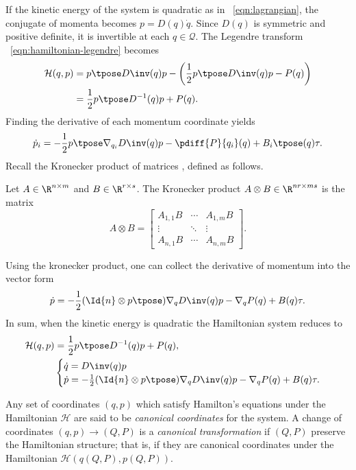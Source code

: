 If the kinetic energy of the system is quadratic as in ~\eqref{eqn:lagrangian}, 
the conjugate of momenta becomes \(p = D(q)\dot{q}\). Since \(D(q)\) is symmetric
and positive definite, it is invertible at each \(q \in \mathcal{Q}\).
The Legendre transform ~\eqref{eqn:hamiltonian-legendre} becomes
\begin{align*}
    \mathcal{H}(q,p) &= p\tpose D\inv(q)p - \left( \frac{1}{2}p\tpose D\inv(q) p -
    P(q) \right) \\
         &= \frac{1}{2} p\tpose D^{-1}(q) p + P(q)
    .
\end{align*}
Finding the derivative of each momentum coordinate yields
\[
    \dot{p}_i = -\frac{1}{2} p\tpose \nabla_{q_i}D\inv(q) p 
        - \pdiff{P}{q_i}(q) + B_i\tpose(q) \tau
    .
\]
Recall the Kronecker product of matrices \cite{kronprod}, defined as follows.
\begin{defn}
    Let \(A \in \R^{n \times m}\) and \(B \in \R^{r \times s}\).
    The Kronecker product \(A \otimes B \in \R^{nr \times ms}\) is the  matrix
    \[
        A \otimes B = \begin{bmatrix}
            A_{1,1}B & \cdots & A_{1,m} B \\
            \vdots & \ddots & \vdots \\
            A_{n,1} B & \cdots & A_{n,m} B
        \end{bmatrix} 
        .
    \]
\end{defn}
Using the kronecker product, one can collect the derivative of momentum into
the vector form
\[
    \dot{p} = -\frac{1}{2} (\Id{n} \otimes p\tpose) \nabla_q D\inv(q) p
    - \nabla_q P(q) + B(q) \tau
    .
\]
In sum, when the kinetic energy is quadratic the Hamiltonian system reduces to
\begin{align}\label{eqn:hamiltonian}
    \mathcal{H}(q,p) &= \frac{1}{2} p\tpose D^{-1}(q) p + P(q)
    , \\
     &\begin{cases}
        \dot{q} = D\inv(q)p \\
        \dot{p} = -\frac{1}{2} (\Id{n} \otimes p\tpose) \nabla_q D\inv(q) p
        - \nabla_q P(q) + B(q) \tau
        . \\
    \end{cases} \label{eqn:hamiltonian-full-dynamics}
\end{align}

Any set of coordinates \((q,p)\) which satisfy Hamilton's equations 
under the Hamiltonian \(\mathcal{H}\) are
said to be \textit{canonical coordinates} for the system. A change of
coordinates \((q,p) \rightarrow (Q,P)\) is a \textit{canonical
transformation} if \((Q,P)\) preserve the Hamiltonian structure; that is, if
they are canonical coordinates under the Hamiltonian
\(\mathcal{H}\left(q(Q,P), p(Q,P)\right)\).

